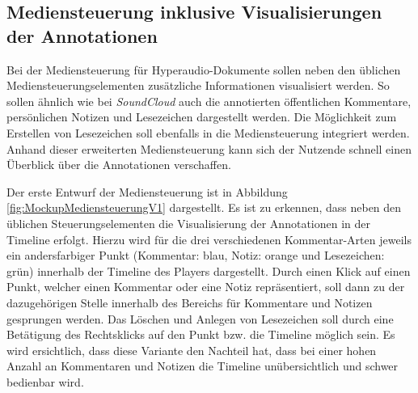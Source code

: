 \subsection{Mediensteuerung inklusive Visualisierungen der Annotationen}
\label{sub:Mediensteuerung}
Bei der Mediensteuerung für Hyperaudio-Dokumente sollen neben den üblichen Mediensteuerungselementen zusätzliche Informationen visualisiert werden. So sollen ähnlich wie bei \textit{SoundCloud} auch die annotierten öffentlichen Kommentare, persönlichen Notizen und Lesezeichen dargestellt werden. Die Möglichkeit zum Erstellen von Lesezeichen soll ebenfalls in die Mediensteuerung integriert werden. Anhand dieser erweiterten Mediensteuerung kann sich der Nutzende schnell einen Überblick über die Annotationen verschaffen.

Der erste Entwurf der Mediensteuerung ist in Abbildung \ref{fig:MockupMediensteuerungV1} dargestellt. Es ist zu erkennen, dass neben den üblichen Steuerungselementen die Visualisierung der Annotationen in der Timeline erfolgt. Hierzu wird für die drei verschiedenen Kommentar-Arten jeweils ein andersfarbiger Punkt (Kommentar: blau, Notiz: orange und Lesezeichen: grün) innerhalb der Timeline des Players dargestellt. Durch einen Klick auf einen Punkt, welcher einen Kommentar oder eine Notiz repräsentiert, soll dann zu der dazugehörigen Stelle innerhalb des Bereichs für Kommentare und Notizen gesprungen werden. Das Löschen und Anlegen von Lesezeichen soll durch eine Betätigung des Rechtsklicks auf den Punkt bzw. die Timeline möglich sein. Es wird ersichtlich, dass diese Variante den Nachteil hat, dass bei einer hohen Anzahl an Kommentaren und Notizen die Timeline unübersichtlich und schwer bedienbar wird.

